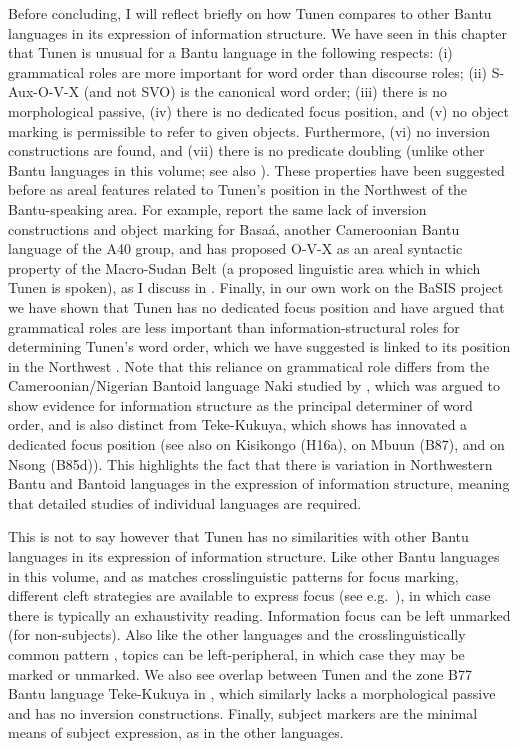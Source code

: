 \documentclass[output=paper,colorlinks,citecolor=brown
]{langscibook}
\begin{document}
Before concluding, I will reflect briefly on how Tunen compares to other Bantu languages in its expression of information structure. We have seen in this chapter that Tunen is unusual for a Bantu language in the following respects: (i) grammatical roles are more important for word order than discourse roles; (ii) S-Aux-O-V-X (and not SVO) is the canonical word order; (iii) there is no morphological passive, (iv) there is no dedicated focus position, and (v) no object marking is permissible to refer to given objects. Furthermore, (vi) no inversion constructions are found, and (vii) there is no predicate doubling (unlike other Bantu languages in this volume; see also \citealt{GüldemannFiedler2022}). These properties have been suggested before as areal features related to Tunen's position in the Northwest of the Bantu-speaking area. For example, \citet{HamlaouiMakasso2015} report the same lack of inversion constructions and object marking for Basaá, another Cameroonian Bantu language of the A40 group, and \citet{Güldemann2008} has proposed O-V-X as an areal syntactic property of the Macro-Sudan Belt (a proposed linguistic area which in which Tunen is spoken), as I discuss in \citet[§6.7--6.8]{KerrFut}. Finally, in our own work on the BaSIS project we have shown that Tunen has no dedicated focus position and have argued that grammatical roles are less important than information-structural roles for determining Tunen's word order, which we have suggested is linked to its position in the Northwest \citep{KerrEtAl2023}. Note that this reliance on grammatical role differs from the Cameroonian/Nigerian Bantoid language Naki studied by \citet{Good2010}, which was argued to show evidence for information structure as the principal determiner of word order, and is also distinct from Teke-Kukuya, which \textcite{chapters/teke, LiFut} shows has innovated a dedicated focus position (see also \citealt{DeKind2014} on Kisikongo (H16a), \citealt{BostoenMundeke2012} on Mbuun (B87), and \citealt{KoniMuluwaBostoen2014} on Nsong (B85d)). This highlights the fact that there is variation in Northwestern Bantu and Bantoid languages in the expression of information structure, meaning that detailed studies of individual languages are required.

This is not to say however that Tunen has no similarities with other Bantu languages in its expression of information structure. Like other Bantu languages in this volume, and as matches crosslinguistic patterns for focus marking, different cleft strategies are available to express focus (see e.g.\ \citealp{FiedlerEtAl2010, FeryIshihara2017}), in which case there is typically an exhaustivity reading. Information focus can be left unmarked (for non-subjects). Also like the other languages and the crosslinguistically common pattern \citep{Gundel1988}, topics can be left-peripheral, in which case they may be marked or unmarked. We also see overlap between Tunen and the zone B77 Bantu language Teke-Kukuya in \textcite{chapters/teke}, which similarly lacks a morphological passive and has no inversion constructions. Finally, subject markers are the minimal means of subject expression, as in the other languages.
\end{document}
